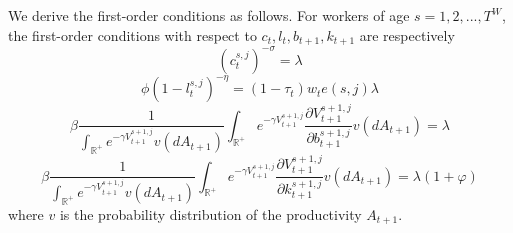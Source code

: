 \documentclass[12pt]{article}
\begin{document}
We derive the first-order conditions as follows. For workers of age $s=1,2,...,T^{W}$, the first-order conditions with respect to $c_t, l_t, b_{t+1}, k_{t+1}$ are respectively
\begin{equation}
(c_{t}^{s,j})^{-\sigma} = \lambda \label{eq:1}
\end{equation}
\begin{equation}
\phi(1-l_{t}^{s,j})^{-\eta} = (1-\tau_t)w_te(s,j)\lambda \label{eq:2}
\end{equation}
\begin{equation}
\beta\frac{1}{\int_{\mathbb{R}^+} e^{{-\gamma}{V_{t+1}^{s+1,j}}}v(dA_{t+1})}\int_{\mathbb{R}^+} e^{{-\gamma}{V_{t+1}^{s+1,j}}}\frac{\partial V_{t+1}^{s+1,j}}{\partial b_{t+1}^{s+1,j}}v (dA_{t+1})=\lambda \label{eq:3}
\end{equation}
\begin{equation}
\beta\frac{1}{\int_{\mathbb{R}^+} e^{{-\gamma}{V_{t+1}^{s+1,j}}}v(dA_{t+1})}\int_{\mathbb{R}^+} e^{{-\gamma}{V_{t+1}^{s+1,j}}}\frac{\partial V_{t+1}^{s+1,j}}{\partial k_{t+1}^{s+1,j}}v(dA_{t+1})=\lambda(1+\varphi) \label{eq:4}
\end{equation}
where $v$ is the probability distribution of the productivity $A_{t+1}$.
\end{document}
